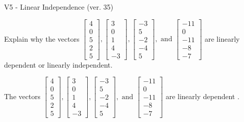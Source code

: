 \begin{exercise}
  \begin{exerciseTitle}V5 - Linear Independence (ver. 35)\end{exerciseTitle}
  \begin{exerciseStatement}
    Explain why the vectors \(\left[\begin{array}{r}
4 \\
0 \\
5 \\
2 \\
5
\end{array}\right] , \left[\begin{array}{r}
3 \\
0 \\
1 \\
4 \\
-3
\end{array}\right] , \left[\begin{array}{r}
-3 \\
5 \\
-2 \\
-4 \\
5
\end{array}\right] , \text{ and } \left[\begin{array}{r}
-11 \\
0 \\
-11 \\
-8 \\
-7
\end{array}\right]\) are linearly dependent or linearly independent.	


  \end{exerciseStatement}
  \begin{exerciseAnswer}
   The vectors \(\left[\begin{array}{r}
4 \\
0 \\
5 \\
2 \\
5
\end{array}\right] , \left[\begin{array}{r}
3 \\
0 \\
1 \\
4 \\
-3
\end{array}\right] , \left[\begin{array}{r}
-3 \\
5 \\
-2 \\
-4 \\
5
\end{array}\right] , \text{ and } \left[\begin{array}{r}
-11 \\
0 \\
-11 \\
-8 \\
-7
\end{array}\right]\) are 
  	 linearly dependent  .
  


  \end{exerciseAnswer}
\end{exercise}